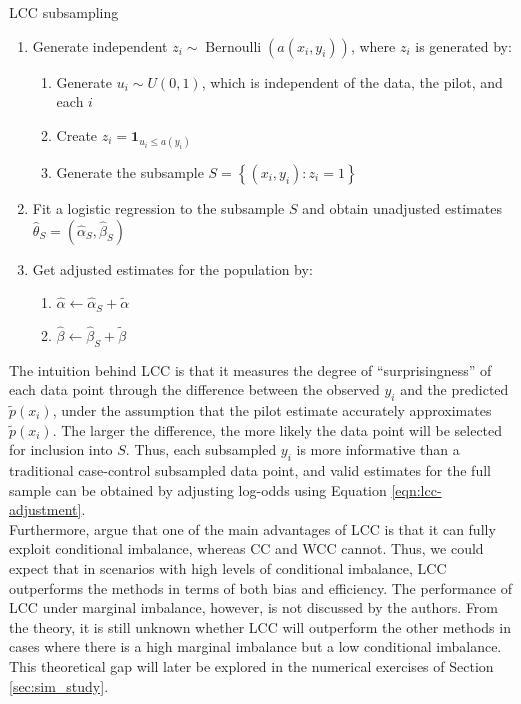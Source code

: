\begin{algorithm}[ht]
  \caption{LCC subsampling}
  \begin{enumerate}
    \item 
    Generate independent $z_i \sim \operatorname{Bernoulli}\left(a\left(x_i,y_i\right)\right)$, where $z_i$ is generated by:
    \begin{enumerate}
      \item 
      Generate $u_i \sim U(0,1)$, which is independent of the data, the pilot, and each $i$
      \item 
      Create $z_i=\mathbf{1}_{u_i \leq a\left(y_i\right)}$
      \item Generate the subsample $S=\left\{\left(x_i, y_i\right): z_i=1\right\}$ 
    \end{enumerate}
    \item 
    Fit a logistic regression to the subsample $S$ and obtain unadjusted estimates $\hat{\theta}_{S}=(\hat{\alpha}_{S}, \hat{\beta}_{S})$
    \item
    Get adjusted estimates for the population by:
    \begin{enumerate}
        \item $\hat{\alpha} \leftarrow \hat{\alpha}_{S}+ \tilde{\alpha}$
        \item $\hat{\beta} \leftarrow \hat{\beta}_{S} + \tilde{\beta}$
    \end{enumerate}
  \end{enumerate}
  \label{alg:alg_lcc}
\end{algorithm}

The intuition behind LCC is that it measures the degree of ``surprisingness'' of each data point through the difference between the observed $y_i$ and the predicted $\tilde{p}(x_i)$, under the assumption that the pilot estimate accurately approximates $\tilde{p}(x_i)$. The larger the difference, the more likely the data point will be selected for inclusion into $S$. Thus, each subsampled $y_i$ is more informative than a traditional case-control subsampled data point, and valid estimates for the full sample can be obtained by adjusting log-odds using Equation \ref{eqn:lcc-adjustment}.\\

Furthermore, \textcite{hastie2014} argue that one of the main advantages of LCC is that it can fully exploit conditional imbalance, whereas CC and WCC cannot. Thus, we could expect that in scenarios with high levels of conditional imbalance, LCC outperforms the methods in terms of both bias and efficiency. The performance of LCC under marginal imbalance, however, is not discussed by the authors. From the theory, it is still unknown whether LCC will outperform the other methods in cases where there is a high marginal imbalance but a low conditional imbalance. This theoretical gap will later be explored in the numerical exercises of Section \ref{sec:sim_study}.


